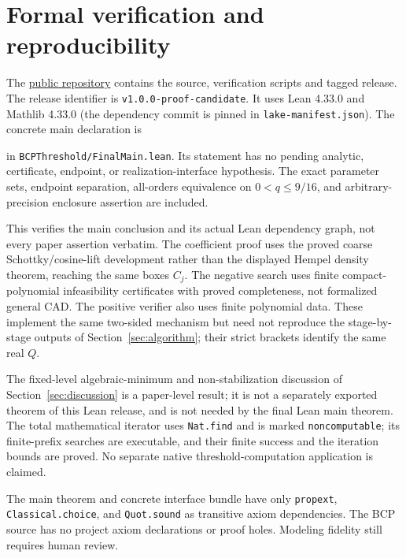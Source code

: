 \documentclass[11pt,a4paper]{article}
\theoremstyle{definition}\newtheorem{definition}[theorem]{Definition}
\theoremstyle{remark}\newtheorem{remark}[theorem]{Remark}
\begin{document}
\section{Formal verification and reproducibility}\label{sec:formalcoverage}
The \href{https://github.com/chengxuandi/belgian-chocolate-problem-lean-proof-20260910210030-init}{public repository}
contains the source, verification scripts and tagged release.
The release identifier is \texttt{v1.0.0-proof-candidate}. It uses Lean 4.33.0
and Mathlib 4.33.0 (the dependency commit is pinned in
\texttt{lake-manifest.json}). The concrete main declaration is
\begin{center}\small
{}
\end{center}
in \texttt{BCPThreshold/FinalMain.lean}. Its statement has no pending
analytic, certificate, endpoint, or realization-interface hypothesis.
The exact parameter sets, endpoint separation, all-orders equivalence
on $0<q\le9/16$, and arbitrary-precision enclosure assertion are included.

This verifies the main conclusion and its actual Lean dependency graph,
not every paper assertion verbatim. The coefficient proof uses the proved
coarse Schottky/cosine-lift development rather than the displayed Hempel
density theorem, reaching the same boxes $C_j$. The negative search uses
finite compact-polynomial infeasibility certificates with proved completeness,
not formalized general CAD. The positive verifier also uses finite polynomial
data. These implement the same two-sided mechanism but need not reproduce
the stage-by-stage outputs of Section~\ref{sec:algorithm}; their strict
brackets identify the same real $Q$.

The fixed-level algebraic-minimum and non-stabilization discussion of
Section~\ref{sec:discussion} is a paper-level result; it is not a separately
exported theorem of this Lean release, and is not needed by the final Lean
main theorem. The total mathematical iterator uses \texttt{Nat.find} and
is marked \texttt{noncomputable}; its finite-prefix searches are executable,
and their finite success and the iteration bounds are proved. No separate
native threshold-computation application is claimed.

The main theorem and concrete interface bundle have only
\texttt{propext}, \texttt{Classical.choice}, and \texttt{Quot.sound}
as transitive axiom dependencies. The BCP source has no project axiom
declarations or proof holes. Modeling fidelity still requires human review.
\end{document}
